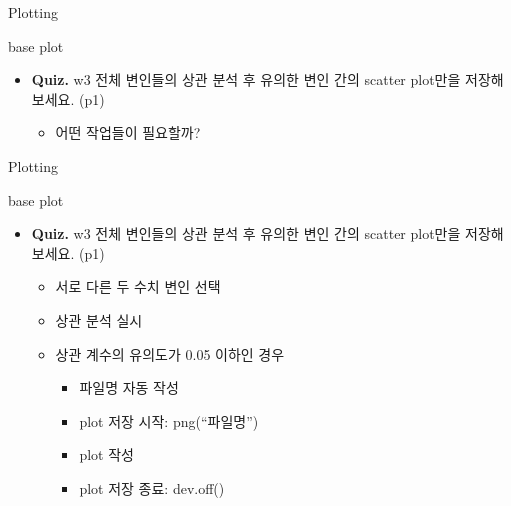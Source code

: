 \documentclass[ignorenonframetext,]{beamer}
\providecommand{\tightlist}{%
  \setlength{\itemsep}{0pt}\setlength{\parskip}{0pt}}
\begin{document}
\begin{frame}{Plotting}

\begin{block}{base plot}

\begin{itemize}
\item
  \textbf{Quiz.} w3 전체 변인들의 상관 분석 후 유의한 변인 간의 scatter
  plot만을 저장해보세요. (p1)

  \begin{itemize}
  \tightlist
  \item
    어떤 작업들이 필요할까?
  \end{itemize}
\end{itemize}

\end{block}

\end{frame}

\begin{frame}{Plotting}

\begin{block}{base plot}

\begin{itemize}
\item
  \textbf{Quiz.} w3 전체 변인들의 상관 분석 후 유의한 변인 간의 scatter
  plot만을 저장해보세요. (p1)

  \begin{itemize}
  \item
    서로 다른 두 수치 변인 선택
  \item
    상관 분석 실시
  \item
    상관 계수의 유의도가 0.05 이하인 경우

    \begin{itemize}
    \item
      파일명 자동 작성
    \item
      plot 저장 시작: png(``파일명'')
    \item
      plot 작성
    \item
      plot 저장 종료: dev.off()
    \end{itemize}
  \end{itemize}
\end{itemize}

\end{block}

\end{frame}
\end{document}

